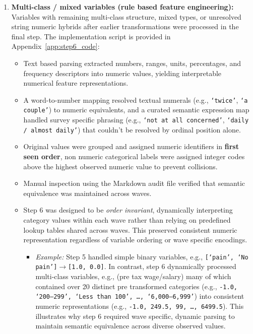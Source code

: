 \begin{enumerate}
    \item \textbf{Multi-class / mixed variables (rule based feature engineering):} Variables with remaining multi-class structure, mixed types, or unresolved string numeric hybrids after earlier transformations were processed in the final step. The implementation script is provided in Appendix~\ref{app:step6_code}:
    \begin{itemize}
        \item[-] Text based parsing extracted numbers, ranges, units, percentages, and frequency descriptors into numeric values, yielding interpretable numerical feature representations.  
        \item[-] A word-to-number mapping resolved textual numerals (e.g., \texttt{`twice'}, \texttt{`a couple'}) to numeric equivalents, and a curated semantic expression map handled survey specific phrasing (e.g., \texttt{`not at all concerned'}, \texttt{`daily / almost daily'}) that couldn't be resolved by ordinal position alone.
        \item[-] Original values were grouped and assigned numeric identifiers in \textbf{first seen order}, non numeric categorical labels were assigned integer codes above the highest observed numeric value to prevent collisions.  
        \item[-] Manual inspection using the Markdown audit file verified that semantic equivalence was maintained across waves.  
        \item[-] Step 6 was designed to be \emph{order invariant}, dynamically interpreting category values within each wave rather than relying on predefined lookup tables shared across waves. This preserved consistent numeric representation regardless of variable ordering or wave specific encodings.
        \begin{itemize}
        \item[-] \textit{Example:} Step 5 handled simple binary variables, e.g., \texttt{[`pain', `No pain']}$\rightarrow$\texttt{[1.0, 0.0]}. In contrast, step 6 dynamically processed multi-class variables, e.g., (pre tax wage/salary) many of which contained over 20 distinct pre transformed categories (e.g., \texttt{-1.0, `200--299', `Less than 100', \ldots, `6,000--6,999'}) into consistent numeric representations (e.g., \texttt{-1.0, 249.5, 99, \ldots, 6499.5}). This illustrates why step 6 required wave specific, dynamic parsing to maintain semantic equivalence across diverse observed values.
        \end{itemize}
    \end{itemize}
\end{enumerate}

